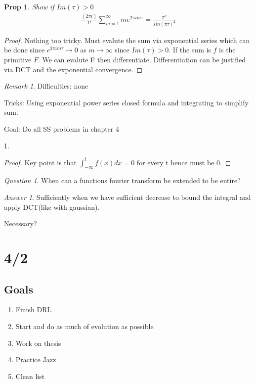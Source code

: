 \documentclass[11pt]{article}
\newtheorem{prop}{Prop}
\theoremstyle{remark}
\newtheorem{remark}{Remark}
\newtheorem{quest}{Question}
\newtheorem{ans}{Answer}
\begin{document}
\begin{prop}
	Show if $Im(\tau) > 0$
	\begin{align*}
		\frac{(2\pi i)}{1!} \sum_{m=1}^{\infty} me^{2 \pi i m \tau} = \frac{\pi^2}{sin(\pi \tau)^2}
	\end{align*}
\end{prop}

\begin{proof}
	Nothing too tricky. Must evalute the sum via exponential series which can be done since $e^{2 \pi i m \tau} \to 0$ as $m\to \infty$ since $Im(\tau) > 0$. If the sum is $f$ is the primitive $F$. We can evalute F then differentiate. Differentiation can be justified via DCT and the exponential convergence.
\end{proof}

\begin{remark}
	Difficulties: none

	Tricks: Using exponential power series closed formula and integrating to simplify sum.
\end{remark}

Goal: Do all SS problems in chapter 4

1.

\begin{proof}
	Key point is that $\int_{-\infty}^tf(x)dx = 0$ for every t hence must be 0. 
\end{proof}



\begin{quest}
	When can a functions fourier transform be extended to be entire?
\end{quest}

\begin{ans}
	Sufficiently when we have sufficient decrease to bound the integral and apply DCT(like with gaussian). 

	Necessary?
\end{ans}


\section{4/2}

\subsection{Goals}

\begin{enumerate}
	\item Finish DRL
	\item Start and do as much of evolution as possible
	\item Work on thesis
	\item Practice Jazz
	\item Clean list
\end{enumerate}
\end{document}

